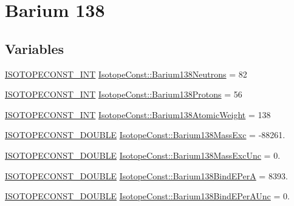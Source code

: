 \hypertarget{group___isotope_const-_barium-_ba138}{}\section{Barium 138}
\label{group___isotope_const-_barium-_ba138}
\subsection*{Variables}
\begin{DoxyCompactItemize}
\item 
\mbox{\hyperlink{group___isotope_const-_macros_ga5f18360b3e99483a35c32d789e62621c}{I\+S\+O\+T\+O\+P\+E\+C\+O\+N\+S\+T\+\_\+\+I\+NT}} \mbox{\hyperlink{group___isotope_const-_barium-_ba138_ga2ac2e367decdf5840aaea6da43a51462}{Isotope\+Const\+::\+Barium138\+Neutrons}} = 82
\item 
\mbox{\hyperlink{group___isotope_const-_macros_ga5f18360b3e99483a35c32d789e62621c}{I\+S\+O\+T\+O\+P\+E\+C\+O\+N\+S\+T\+\_\+\+I\+NT}} \mbox{\hyperlink{group___isotope_const-_barium-_ba138_gaaba6b417c584d58595526b19c538ecae}{Isotope\+Const\+::\+Barium138\+Protons}} = 56
\item 
\mbox{\hyperlink{group___isotope_const-_macros_ga5f18360b3e99483a35c32d789e62621c}{I\+S\+O\+T\+O\+P\+E\+C\+O\+N\+S\+T\+\_\+\+I\+NT}} \mbox{\hyperlink{group___isotope_const-_barium-_ba138_gab278079c091ef79fd6f4026a4af20ebe}{Isotope\+Const\+::\+Barium138\+Atomic\+Weight}} = 138
\item 
\mbox{\hyperlink{group___isotope_const-_macros_ga8f45a7272ce02c0b4c65c44636ed719a}{I\+S\+O\+T\+O\+P\+E\+C\+O\+N\+S\+T\+\_\+\+D\+O\+U\+B\+LE}} \mbox{\hyperlink{group___isotope_const-_barium-_ba138_gaccc7890ba6a8ea2d3902693294f7a9d6}{Isotope\+Const\+::\+Barium138\+Mass\+Exc}} = -\/88261.
\item 
\mbox{\hyperlink{group___isotope_const-_macros_ga8f45a7272ce02c0b4c65c44636ed719a}{I\+S\+O\+T\+O\+P\+E\+C\+O\+N\+S\+T\+\_\+\+D\+O\+U\+B\+LE}} \mbox{\hyperlink{group___isotope_const-_barium-_ba138_gaaad9bf13acd9e8039f5b913805b39dea}{Isotope\+Const\+::\+Barium138\+Mass\+Exc\+Unc}} = 0.
\item 
\mbox{\hyperlink{group___isotope_const-_macros_ga8f45a7272ce02c0b4c65c44636ed719a}{I\+S\+O\+T\+O\+P\+E\+C\+O\+N\+S\+T\+\_\+\+D\+O\+U\+B\+LE}} \mbox{\hyperlink{group___isotope_const-_barium-_ba138_ga45fa0009cb54fe1408668e863515c4db}{Isotope\+Const\+::\+Barium138\+Bind\+E\+PerA}} = 8393.
\item 
\mbox{\hyperlink{group___isotope_const-_macros_ga8f45a7272ce02c0b4c65c44636ed719a}{I\+S\+O\+T\+O\+P\+E\+C\+O\+N\+S\+T\+\_\+\+D\+O\+U\+B\+LE}} \mbox{\hyperlink{group___isotope_const-_barium-_ba138_ga4019e6b15d239a703023718f213f204e}{Isotope\+Const\+::\+Barium138\+Bind\+E\+Per\+A\+Unc}} = 0.

\end{DoxyCompactItemize}
